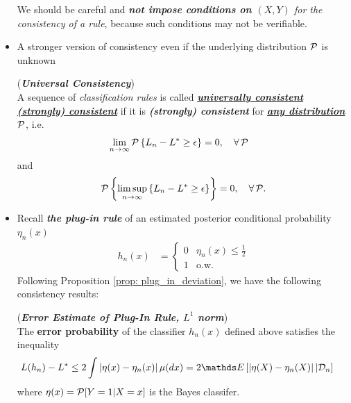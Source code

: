 \documentclass[11pt]{article}
\begin{document}
\begin{itemize}
\begin{remark}
We should be careful and \emph{\textbf{not impose conditions on $(X, Y)$} for the consistency of a rule}, because such conditions may not be verifiable. 
\end{remark}


\item A stronger version of consistency even if  the underlying distribution ${\mathcal P}$ is unknown
\begin{definition} (\emph{\textbf{Universal Consistency}})\\
A sequence of \emph{classification rules} is called \underline{\emph{\textbf{universally consistent (strongly) consistent}}} if it is \emph{\textbf{(strongly) consistent}} for \underline{\emph{\textbf{any distribution}}} ${\mathcal P}$, i.e. 
\begin{align*}
\lim\limits_{n\rightarrow \infty}{\mathcal P}\left\{ L_{n}  - L^{*}\ge \epsilon \right\}&= 0, \quad \forall\, {\mathcal P} 
\end{align*}
and 
\begin{align*}
{\mathcal P}\left\{ \limsup\limits_{n\rightarrow \infty}\left\{L_{n} - L^{*}\ge \epsilon \right\}\right\} = 0, \quad \forall\, {\mathcal P}.
\end{align*}
\end{definition}


\item Recall \emph{\textbf{the plug-in rule}} of an estimated posterior conditional probability $\eta_n(x)$
\begin{align*}
h_n(x) &= \left\{ \begin{array}{cc}
0 & \eta_n(x) \le \frac{1}{2}\\
1 & \text{o.w.}
\end{array}
\right.
\end{align*} Following Proposition \ref{prop: plug_in_deviation}, we have the following consistency results:
\begin{remark} (\textbf{\emph{Error Estimate of Plug-In Rule, $L^1$ norm}}) \citep{devroye2013probabilistic} \\
The \textbf{error probability} of the classifier $h_n(x)$ defined above satisfies the inequality
\begin{align*}
L(h_n) - L^{*} &\le 2 \int \abs{\eta(x) - \eta_n(x)} \mu(dx) =2 \E{}{\abs{\eta(X) - \eta_n(X)}| \cD_n} \
\end{align*} where $\eta(x) = {\mathcal P}[Y =  1| X=x]$ is the Bayes classifer.
\end{remark}


\end{itemize}
\end{document}
